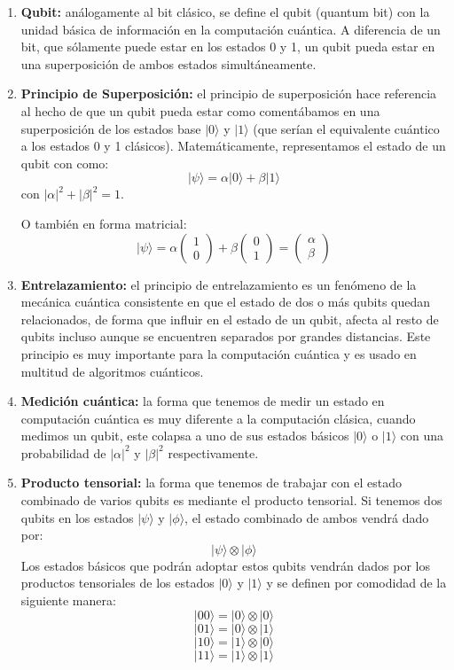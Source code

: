 \begin{enumerate}
    \item \textbf{Qubit:} análogamente al bit clásico, se define el qubit (quantum bit) con la unidad básica de información en la computación cuántica.
    A diferencia de un bit, que sólamente puede estar en los estados 0 y 1, un qubit pueda estar en una superposición de ambos estados simultáneamente.

    
    \item \textbf{Principio de Superposición:} el principio de superposición hace referencia al hecho de que un qubit pueda estar como comentábamos en una superposición de los estados base $|0\rangle$ y $|1\rangle$ (que serían el equivalente cuántico a los estados 0 y 1 clásicos).
    Matemáticamente, representamos el estado de un qubit con como:
    $$|\psi\rangle = \alpha|0\rangle + \beta|1\rangle$$
    con $|\alpha|^2 + |\beta|^2 = 1$.

    O también en forma matricial:
    $$|\psi\rangle = \alpha\begin{pmatrix}
         1  \\
         0 
    \end{pmatrix}
    +
    \beta\begin{pmatrix}
         0  \\
         1 
    \end{pmatrix}
    =
    \begin{pmatrix}
         \alpha  \\
         \beta 
    \end{pmatrix}
    $$

    \item \textbf{Entrelazamiento:} el principio de entrelazamiento es un fenómeno de la mecánica cuántica consistente en que el estado de dos o más qubits quedan relacionados, de forma que influir en el estado de un qubit, afecta al resto de qubits incluso aunque se encuentren separados por grandes distancias.
    Este principio es muy importante para la computación cuántica y es usado en multitud de algoritmos cuánticos.

    \item \textbf{Medición cuántica:} la forma que tenemos de medir un estado en computación cuántica es muy diferente a la computación clásica, cuando medimos un qubit, este colapsa a uno de sus estados básicos $|0\rangle$ o $|1\rangle$ con una probabilidad de $|\alpha|^2$ y $|\beta|^2$ respectivamente.

    \item \textbf{Producto tensorial:} la forma que tenemos de trabajar con el estado combinado de varios qubits es mediante el producto tensorial. 
    Si tenemos dos qubits en los estados $|\psi\rangle$ y $|\phi\rangle$, el estado combinado de ambos vendrá dado por:
    $$|\psi\rangle \otimes |\phi\rangle$$
    Los estados básicos que podrán adoptar estos qubits vendrán dados por los productos tensoriales de los estados $|0\rangle$ y $|1\rangle$ y se definen por comodidad de la siguiente manera:
    $$|00\rangle = |0\rangle \otimes |0\rangle$$
    $$|01\rangle = |0\rangle \otimes |1\rangle$$
    $$|10\rangle = |1\rangle \otimes |0\rangle$$
    $$|11\rangle = |1\rangle \otimes |1\rangle$$


\end{enumerate}
